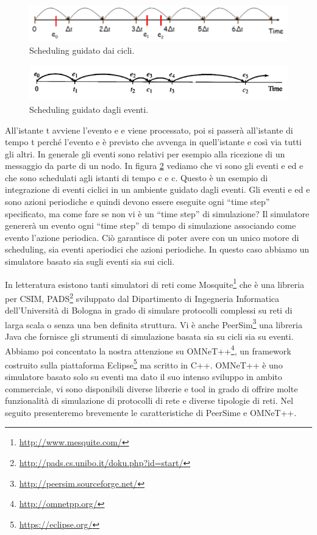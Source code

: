 \begin{figure}[t]
	\centering
	\includegraphics[width=0.9\linewidth, keepaspectratio]{Images/simulatori/cycled_driven_01}
	\caption[Cycle driven scheduling]{Scheduling guidato dai cicli.}
	\label{fig:cycled_driven_01}
\end{figure}

\begin{figure}[t]
	\centering
	\includegraphics[width=0.9\linewidth, keepaspectratio]{Images/simulatori/event_driven_01}
	\caption[Event driven scheduling]{Scheduling guidato dagli eventi.}
	\label{fig:event_driven_01}
\end{figure}

All'istante t avviene l'evento e e viene processato, poi si passerà all'istante di tempo t perché l'evento e è previsto che avvenga in quell'istante e così via tutti gli altri. In generale gli eventi sono relativi per esempio alla ricezione di un messaggio da parte di un nodo. In figura \ref{fig:event_driven_01} vediamo che vi sono gli eventi e ed e che sono schedulati agli istanti di tempo c e c. Questo è un esempio di integrazione di eventi ciclici in un ambiente guidato dagli eventi. Gli eventi e ed e sono azioni periodiche e quindi devono essere eseguite ogni “time step” specificato, ma come fare se non vi è un “time step” di simulazione? Il simulatore genererà un evento ogni “time step” di tempo di simulazione associando come evento l'azione periodica. Ciò garantisce di poter avere con un unico motore di scheduling, sia eventi aperiodici che azioni periodiche. In questo caso abbiamo un simulatore basato sia sugli eventi sia sui cicli.

In letteratura esistono tanti simulatori di reti come Mosquite\footnote{\url{http://www.mesquite.com/}} che è una libreria per CSIM, PADS\footnote{\url{http://pads.cs.unibo.it/doku.php?id=start/}} sviluppato dal Dipartimento di Ingegneria Informatica dell’Università di Bologna in grado di simulare protocolli complessi su reti di larga scala o senza una ben definita struttura. Vi è anche PeerSim\footnote{\url{http://peersim.sourceforge.net/}} una libreria Java che fornisce gli strumenti di simulazione basata sia su cicli sia su eventi. Abbiamo poi concentato la nostra attenzione su OMNeT++\footnote{\url{http://omnetpp.org/}}, un framework costruito sulla piattaforma Eclipse\footnote{\url{https://eclipse.org/}} ma scritto in C++. OMNeT++ è uno simulatore basato solo su eventi ma dato il suo intenso sviluppo in ambito commerciale, vi sono disponibili diverse librerie e tool in grado di offrire molte funzionalità di simulazione di protocolli di rete e diverse tipologie di reti. Nel seguito presenteremo brevemente le caratteristiche di PeerSime e OMNeT++.

